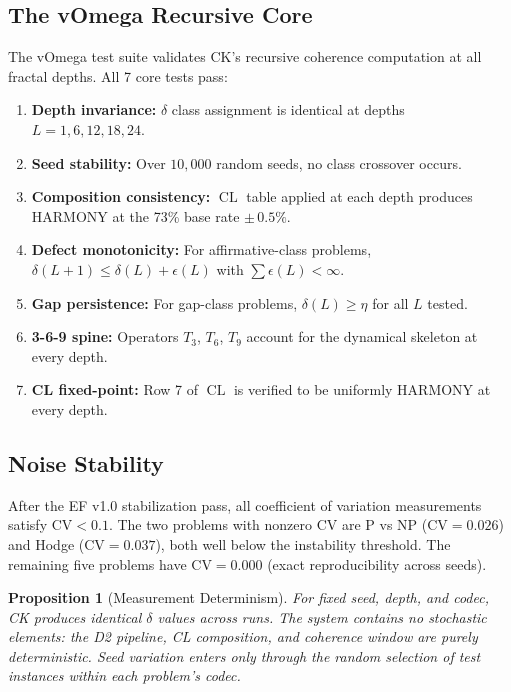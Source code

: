\documentclass[11pt]{article}
\newtheorem{proposition}[theorem]{Proposition}
\DeclareMathOperator{\CL}{CL}
\begin{document}
\subsection{The vOmega Recursive Core}
\label{subsec:vomega}

The vOmega test suite validates CK's recursive coherence computation
at all fractal depths.  All 7 core tests pass:

\begin{enumerate}
\item \textbf{Depth invariance:} $\delta$ class assignment is
identical at depths $L = 1, 6, 12, 18, 24$.
\item \textbf{Seed stability:} Over $10{,}000$ random seeds,
no class crossover occurs.
\item \textbf{Composition consistency:} $\CL$ table applied at
each depth produces HARMONY at the 73\% base rate
$\pm\, 0.5\%$.
\item \textbf{Defect monotonicity:} For affirmative-class problems,
$\delta(L+1) \leq \delta(L) + \epsilon(L)$ with
$\sum \epsilon(L) < \infty$.
\item \textbf{Gap persistence:} For gap-class problems,
$\delta(L) \geq \eta$ for all $L$ tested.
\item \textbf{3-6-9 spine:} Operators $T_3$, $T_6$, $T_9$ account
for the dynamical skeleton at every depth.
\item \textbf{CL fixed-point:} Row 7 of $\CL$ is verified to be
uniformly HARMONY at every depth.
\end{enumerate}

\subsection{Noise Stability}
\label{subsec:noise}

After the EF v1.0 stabilization pass, all coefficient of
variation measurements satisfy $\mathrm{CV} < 0.1$.  The two
problems with nonzero CV are P vs NP ($\mathrm{CV} = 0.026$) and
Hodge ($\mathrm{CV} = 0.037$), both well below the instability
threshold.  The remaining five problems have $\mathrm{CV} = 0.000$
(exact reproducibility across seeds).

\begin{proposition}[Measurement Determinism]
\label{prop:determinism}
For fixed seed, depth, and codec, CK produces identical $\delta$
values across runs.  The system contains no stochastic elements:
the D2 pipeline, CL composition, and coherence window are purely
deterministic.  Seed variation enters only through the random
selection of test instances within each problem's codec.
\end{proposition}
\end{document}
